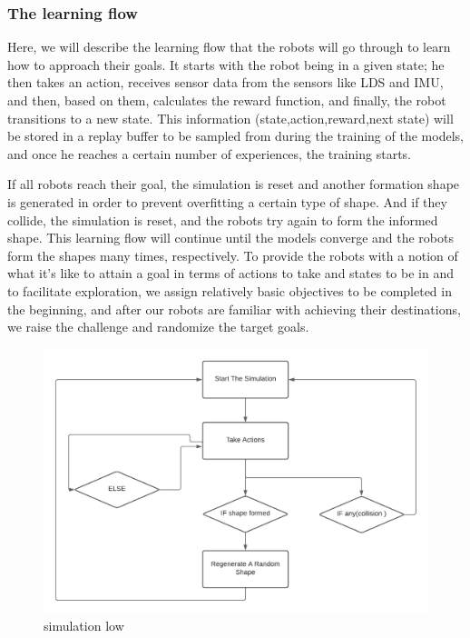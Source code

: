 \documentclass[12pt]{extarticle}
\begin{document}
\subsubsection{The learning flow}
Here, we will describe the learning flow that the robots will go through to learn how to approach their goals.
It starts with the robot being in a given state; he then takes an action, receives sensor data from the sensors like LDS and IMU, and then, based on them, calculates the reward function, and finally, the robot transitions to a new state.
This information (state,action,reward,next state) will be stored in a replay buffer to be sampled from during the training of the models, and once he reaches a certain number of experiences, the training starts.


If all robots reach their goal, the simulation is reset and another formation shape is generated in order to prevent overfitting a certain type of shape.
And if they collide, the simulation is reset, and the robots try again to form the informed shape.
This learning flow will continue until the models converge and the robots form the shapes many times, respectively.
To provide the robots with a notion of what it's like to attain a goal in terms of actions to take and states to be in and to facilitate exploration, we assign relatively basic objectives to be completed in the beginning, and after our robots are familiar with achieving their destinations, we raise the challenge and randomize the target goals.


 \begin{figure}[h]  
\centering
\includegraphics[scale=0.85]{simulation_flow}
\caption[simulation flow]{simulation low}
\end{figure}
\end{document}
